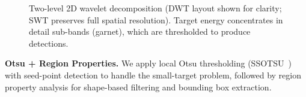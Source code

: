 \documentclass[conference]{IEEEtran}
\begin{document}
\begin{figure}[t]
\caption{Two-level 2D wavelet decomposition (DWT layout shown for clarity; SWT preserves full spatial resolution). Target energy concentrates in detail sub-bands ({\color{USC_Garnet}garnet}), which are thresholded to produce detections.}
\label{fig:wavelet_decomp}
\end{figure}

\textbf{Otsu + Region Properties.} We apply local Otsu thresholding (SSOTSU~\cite{Li2016}) with seed-point detection to handle the small-target problem, followed by region property analysis for shape-based filtering and bounding box extraction.
\end{document}
